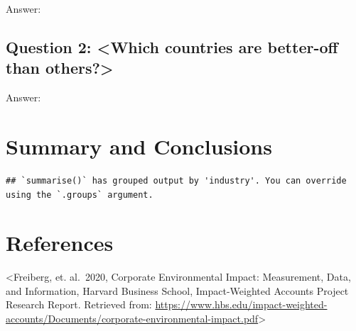 \documentclass[
  12pt,
]{article}
\begin{document}
Answer:

\hypertarget{question-2-which-countries-are-better-off-than-others}{%
\subsection{Question 2: \textless Which countries are better-off than
others?\textgreater{}}\label{question-2-which-countries-are-better-off-than-others}}

Answer:

\newpage

\hypertarget{summary-and-conclusions}{%
\section{Summary and Conclusions}\label{summary-and-conclusions}}

\begin{verbatim}
## `summarise()` has grouped output by 'industry'. You can override using the `.groups` argument.
\end{verbatim}

\newpage

\hypertarget{references}{%
\section{References}\label{references}}

\textless Freiberg, et. al.~2020, Corporate Environmental Impact:
Measurement, Data, and Information, Harvard Business School,
Impact-Weighted Accounts Project Research Report. Retrieved from:
\url{https://www.hbs.edu/impact-weighted-accounts/Documents/corporate-environmental-impact.pdf}\textgreater{}
\end{document}
